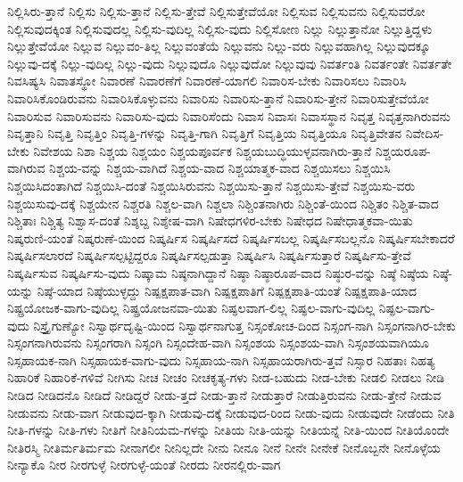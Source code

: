 {ನಿಲ್ಲಿಸಿರು-ತ್ತಾನೆ
ನಿಲ್ಲಿಸು
ನಿಲ್ಲಿಸು-ತ್ತಾನೆ
ನಿಲ್ಲಿಸು-ತ್ತೇವೆ
ನಿಲ್ಲಿಸುತ್ತೇವೆಯೋ
ನಿಲ್ಲಿಸುವ
ನಿಲ್ಲಿಸುವನು
ನಿಲ್ಲಿಸುವರೋ
ನಿಲ್ಲಿಸುವುದಕ್ಕಿಂತ
ನಿಲ್ಲಿಸುವುದಲ್ಲ
ನಿಲ್ಲಿಸು-ವುದಿಲ್ಲ
ನಿಲ್ಲಿಸು-ವುದು
ನಿಲ್ಲಿಸೋಣ
ನಿಲ್ಲು
ನಿಲ್ಲುತ್ತಾನೋ
ನಿಲ್ಲುತ್ತಿದ್ದಳು
ನಿಲ್ಲುತ್ತೇವೆಯೋ
ನಿಲ್ಲುವ
ನಿಲ್ಲುವಂ-ತಿಲ್ಲ
ನಿಲ್ಲುವಂತೆಯೆ
ನಿಲ್ಲುವನು
ನಿಲ್ಲು-ವರು
ನಿಲ್ಲುವಹಾಗಿಲ್ಲ
ನಿಲ್ಲುವುದಕ್ಕೂ
ನಿಲ್ಲುವು-ದಕ್ಕೆ
ನಿಲ್ಲು-ವುದಿಲ್ಲ
ನಿಲ್ಲು-ವುದು
ನಿಲ್ಲುವುದೊ
ನಿಲ್ಲುವುದೋ
ನಿಲ್ಲುವುವು
ನಿವರ್ತಂತಿ
ನಿವರ್ತಂತೇ
ನಿವರ್ತತೇ
ನಿವಸಿಷ್ಯಸಿ
ನಿವಾತಸ್ಥೋ
ನಿವಾರಣೆ
ನಿವಾರಣೆಗೆ
ನಿವಾರಣೆ-ಯಾಗಲಿ
ನಿವಾರಿಸ-ಬೇಕು
ನಿವಾರಿಸಲು
ನಿವಾರಿಸಿ
ನಿವಾರಿಸಿಕೊಂಡಿರುವನು
ನಿವಾರಿಸಿಕೊಳ್ಳುವನು
ನಿವಾರಿಸು
ನಿವಾರಿಸು-ತ್ತಾನೆ
ನಿವಾರಿಸು-ತ್ತೇನೆ
ನಿವಾರಿಸುತ್ತೇವೆಯೋ
ನಿವಾರಿಸುವ
ನಿವಾರಿಸುವನು
ನಿವಾರಿಸು-ವುದು
ನಿವಾರಿಸೆಂದು
ನಿವಾಸ
ನಿವಾಸಃ
ನಿವಾಸಸ್ಥಾನ
ನಿವೃತ್ತ
ನಿವೃತ್ತನಾಗಿರುವನು
ನಿವೃತ್ತಾನಿ
ನಿವೃತ್ತಿ
ನಿವೃತ್ತಿಂ
ನಿವೃತ್ತಿ-ಗಳನ್ನು
ನಿವೃತ್ತಿ-ಗಾಗಿ
ನಿವೃತ್ತಿಗೆ
ನಿವೃತ್ತಿಯ
ನಿವೃತ್ತಿಯೂ
ನಿವೃತ್ತಿವೇತನ
ನಿವೇದಿಸ-ಬೇಕು
ನಿವೇಶಯ
ನಿಶಾ
ನಿಶ್ಚಯ
ನಿಶ್ಚಯಂ
ನಿಶ್ಚಯಪೂರ್ವಕ
ನಿಶ್ಚಯಬುದ್ಧಿಯುಳ್ಳವನಾಗಿರು-ತ್ತಾನೆ
ನಿಶ್ಚಯರೂಪ-ವಾಗಿರುವ
ನಿಶ್ಚಯ-ವನ್ನು
ನಿಶ್ಚಯ-ವಾಗಿದೆ
ನಿಶ್ಚಯ-ವಾದ
ನಿಶ್ಚಯಾತ್ಮಕ-ವಾದ
ನಿಶ್ಚಯಿಸಲು
ನಿಶ್ಚಯಿಸಿ
ನಿಶ್ಚಯಿಸಿದಂತಾಗಿದೆ
ನಿಶ್ಚಯಿಸಿ-ದಂತೆ
ನಿಶ್ಚಯಿಸಿರುವನು
ನಿಶ್ಚಯಿಸು-ತ್ತಾನೆ
ನಿಶ್ಚಯಿಸು-ತ್ತೇವೆ
ನಿಶ್ಚಯಿಸು-ವರು
ನಿಶ್ಚಯಿಸುವು-ದಕ್ಕೆ
ನಿಶ್ಚಯೇನ
ನಿಶ್ಚರತಿ
ನಿಶ್ಚಲ-ವಾಗಿ
ನಿಶ್ಚಲಾ
ನಿಶ್ಚಿಂತನಾಗಿರು
ನಿಶ್ಚಿಂತೆ-ಯಿಂದ
ನಿಶ್ಚಿತಂ
ನಿಶ್ಚಿತ-ವಾದ
ನಿಶ್ಚಿತಾಃ
ನಿಶ್ಚಿತ್ಯ
ನಿಶ್ವಾಸ-ದಂತೆ
ನಿಶ್ಶಬ್ದ
ನಿಶ್ಶೇಷ-ವಾಗಿ
ನಿಷೇಧಗಳಿರ-ಬೇಕು
ನಿಷೇಧದ
ನಿಷೇಧಾತ್ಮಕವಾ-ಯಿತು
ನಿಷ್ಕರುಣಿ-ಯಂತೆ
ನಿಷ್ಕರುಣೆ-ಯಿಂದ
ನಿಷ್ಕರ್ಷಿಸ
ನಿಷ್ಕರ್ಷಿಸದೆ
ನಿಷ್ಕರ್ಷಿಸಬಲ್ಲ
ನಿಷ್ಕರ್ಷಿಸಬಲ್ಲನೊ
ನಿಷ್ಕರ್ಷಿಸಬೇಕಾದರೆ
ನಿಷ್ಕರ್ಷಿಸಲಾರದೆ
ನಿಷ್ಕರ್ಷಿಸಲ್ಪಟ್ಟಿದ್ದರೂ
ನಿಷ್ಕರ್ಷಿಸಲ್ಪಡುತ್ತಾ
ನಿಷ್ಕರ್ಷಿಸಿ
ನಿಷ್ಕರ್ಷಿಸುತ್ತಾರೆ
ನಿಷ್ಕರ್ಷಿಸು-ತ್ತೇವೆ
ನಿಷ್ಕರ್ಷಿಸುವ
ನಿಷ್ಕರ್ಷಿಸು-ವುದು
ನಿಷ್ಕಾಮ
ನಿಷ್ಠನಾಗಿದ್ದಾನೆ
ನಿಷ್ಠಾ
ನಿಷ್ಠಾರೂಪ-ವಾದ
ನಿಷ್ಠುರ-ವನ್ನು
ನಿಷ್ಠೆ
ನಿಷ್ಠೆಯ
ನಿಷ್ಠೆ-ಯನ್ನು
ನಿಷ್ಠೆ-ಯಾದ
ನಿಷ್ಠೆಯುಳ್ಳದ್ದು
ನಿಷ್ಪಕ್ಷಪಾತ-ವಾಗಿ
ನಿಷ್ಪಕ್ಷಪಾತಿಗೆ
ನಿಷ್ಪಕ್ಷಪಾತಿ-ಯಂತೆ
ನಿಷ್ಪಕ್ಷಪಾತಿ-ಯಾದ
ನಿಷ್ಪ್ರಯೋಜಕ-ವಾಗು-ವುದಿಲ್ಲ
ನಿಷ್ಪ್ರಯೋಜನವಾ-ಯಿತು
ನಿಷ್ಫಲವಾಗ-ಲಿಲ್ಲ
ನಿಷ್ಫಲ-ವಾಗು-ವುದಿಲ್ಲ
ನಿಷ್ಫಲ-ವಾಗು-ವುದು
ನಿಸ್ತ್ರೈಗುಣ್ಯೋ
ನಿಸ್ವಾರ್ಥದೃಷ್ಟಿ-ಯಿಂದ
ನಿಸ್ವಾರ್ಥನಾಗುತ್ತ
ನಿಸ್ಸಂಕೋಚ-ದಿಂದ
ನಿಸ್ಸಂಗ-ನಾಗಿ
ನಿಸ್ಸಂಗನಾಗಿರ-ಬೇಕು
ನಿಸ್ಸಂಗನಾಗಿರುವನು
ನಿಸ್ಸಂಗರಾಗಿ
ನಿಸ್ಸಂಗಿ
ನಿಸ್ಸಂದೇಹ-ವಾಗಿ
ನಿಸ್ಸಂಶಯ
ನಿಸ್ಸಂಶಯ-ವಾಗಿ
ನಿಸ್ಸಂಶಯವಾಗಿಯೂ
ನಿಸ್ಸಹಾಯಕ-ನಾಗಿ
ನಿಸ್ಸಹಾಯಕ-ವಾಗು-ವುದು
ನಿಸ್ಸಹಾಯ-ನಾಗಿ
ನಿಸ್ಸಹಾಯರಾಗಿರು-ತ್ತವೆ
ನಿಸ್ಸಾರ
ನಿಹತಾಃ
ನಿಹತ್ಯ
ನಿಹಾರಿಕೆ
ನಿಹಾರಿಕೆ-ಗಳಿವೆ
ನೀಗಿಸು
ನೀಚ
ನೀಚಂ
ನೀಚಕೃತ್ಯ-ಗಳು
ನೀಡ-ಬಹುದು
ನೀಡ-ಬೇಕು
ನೀಡಲಿ
ನೀಡಲು
ನೀಡಿ
ನೀಡಿದ
ನೀಡಿದನೊ
ನೀಡಿದೆ
ನೀಡಿದ್ದರೆ
ನೀಡು-ತ್ತದೆ
ನೀಡು-ತ್ತಾನೆ
ನೀಡುತ್ತಾರೆ
ನೀಡುತ್ತಿರುವನು
ನೀಡು-ತ್ತೇನೆ
ನೀಡುವ
ನೀಡುವನು
ನೀಡು-ವಾಗ
ನೀಡುವುದ-ಕ್ಕಾಗಿ
ನೀಡುವು-ದಕ್ಕೆ
ನೀಡುವುದ-ರಿಂದ
ನೀಡು-ವುದು
ನೀಡುವುದೇ
ನೀಡೆಂದು
ನೀತಿ
ನೀತಿ-ಗಳನ್ನು
ನೀತಿ-ಗಳು
ನೀತಿಗೆ
ನೀತಿನಿಯಮ-ಗಳನ್ನು
ನೀತಿಯ
ನೀತಿ-ಯನ್ನು
ನೀತಿಯನ್ನೆ
ನೀತಿ-ಯಿಂದ
ನೀತಿಯೊಂದೇ
ನೀತಿರಸ್ಮಿ
ನೀತಿರ್ಮತಿರ್ಮಮ
ನೀನಾಗಲೀ
ನೀನಿಲ್ಲದೇ
ನೀನು
ನೀನೂ
ನೀನೆ
ನೀನೇ
ನೀನೇಕೆ
ನೀನೊಬ್ಬನೇ
ನೀನೊಳ್ಳೆಯ
ನೀನ್ಯಾಕೊ
ನೀರ
ನೀರಗುಳ್ಳೆ
ನೀರಗುಳ್ಳೆ-ಯಂತೆ
ನೀರದು
ನೀರನಲ್ಲಿರು-ವಾಗ
}
